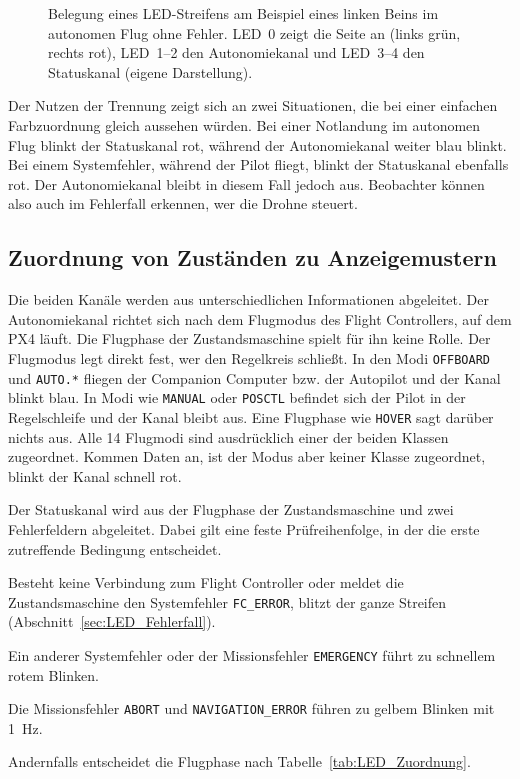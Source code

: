             \begin{figure}[H]
                \centering
                
                \caption{Belegung eines LED-Streifens am Beispiel eines linken Beins im autonomen Flug ohne Fehler. LED~0 zeigt die Seite an (links grün, rechts rot), LED~1--2 den Autonomiekanal und LED~3--4 den Statuskanal (eigene Darstellung).}
                \label{fig:LED_Belegung}
            \end{figure}

            Der Nutzen der Trennung zeigt sich an zwei Situationen, die bei einer einfachen Farbzuordnung gleich aussehen würden. Bei einer Notlandung im autonomen Flug blinkt der Statuskanal rot, während der Autonomiekanal weiter blau blinkt. Bei einem Systemfehler, während der Pilot fliegt, blinkt der Statuskanal ebenfalls rot. Der Autonomiekanal bleibt in diesem Fall jedoch aus. Beobachter können also auch im Fehlerfall erkennen, wer die Drohne steuert.

        \subsection{Zuordnung von Zuständen zu Anzeigemustern}
        \label{sec:LED_Zuordnung}

            Die beiden Kanäle werden aus unterschiedlichen Informationen abgeleitet. Der Autonomiekanal richtet sich nach dem Flugmodus des Flight Controllers, auf dem PX4 läuft. Die Flugphase der Zustandsmaschine spielt für ihn keine Rolle. Der Flugmodus legt direkt fest, wer den Regelkreis schließt. In den Modi \texttt{OFFBOARD} und \texttt{AUTO.*} fliegen der Companion Computer bzw. der Autopilot und der Kanal blinkt blau. In Modi wie \texttt{MANUAL} oder \texttt{POSCTL} befindet sich der Pilot in der Regelschleife und der Kanal bleibt aus. Eine Flugphase wie \texttt{HOVER} sagt darüber nichts aus. Alle 14 Flugmodi sind ausdrücklich einer der beiden Klassen zugeordnet. Kommen Daten an, ist der Modus aber keiner Klasse zugeordnet, blinkt der Kanal schnell rot.

            Der Statuskanal wird aus der Flugphase der Zustandsmaschine und zwei Fehlerfeldern abgeleitet. Dabei gilt eine feste Prüfreihenfolge, in der die erste zutreffende Bedingung entscheidet.

            \begin{description}[style=nextline]
                \item[Keine Verbindung] Besteht keine Verbindung zum Flight Controller oder meldet die Zustandsmaschine den Systemfehler \texttt{FC\_ERROR}, blitzt der ganze Streifen (Abschnitt~\ref{sec:LED_Fehlerfall}).
                \item[Fehler] Ein anderer Systemfehler oder der Missionsfehler \texttt{EMERGENCY} führt zu schnellem rotem Blinken.
                \item[Unterbrechung] Die Missionsfehler \texttt{ABORT} und \texttt{NAVIGATION\_ERROR} führen zu gelbem Blinken mit \SI{1}{\hertz}.
                \item[Flugphase] Andernfalls entscheidet die Flugphase nach Tabelle~\ref{tab:LED_Zuordnung}.
            \end{description}

